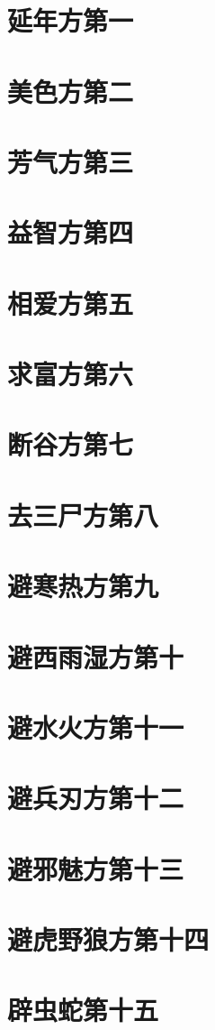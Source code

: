 \documentclass[a4paper,12pt,UTF8,twoside]{ctexbook}
\begin{document}
\chapter{延年方第一}
\chapter{美色方第二}
\chapter{芳气方第三}
\chapter{益智方第四}
\chapter{相爱方第五}
\chapter{求富方第六}
\chapter{断谷方第七}
\chapter{去三尸方第八}
\chapter{避寒热方第九}
\chapter{避西雨湿方第十}
\chapter{避水火方第十一}
\chapter{避兵刃方第十二}
\chapter{避邪魅方第十三}
\chapter{避虎野狼方第十四}
\chapter{辟虫蛇第十五}
\end{document}
